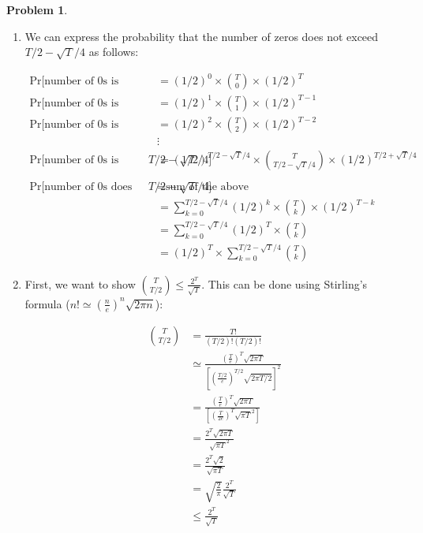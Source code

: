 \documentclass[11pt]{article}
\theoremstyle{definition}
\theoremstyle{case}
\theoremstyle{theorem}
\newtheorem{prob}{Problem}
\begin{document}
\newpage

\begin{prob}
\end{prob}

\begin{enumerate}[label=(\alph*)]

\item We can express the probability that the number of zeros does not exceed $T/2 - \sqrt T /4$ as follows:

\begin{align*}
  \text{Pr[number of 0s is exactly 0]} &= (1/2)^{0} \times {T \choose 0} \times (1/2)^{T} \\
  \text{Pr[number of 0s is exactly 1]} &= (1/2)^{1} \times {T \choose 1} \times (1/2)^{T-1} \\
  \text{Pr[number of 0s is exactly 2]} &= (1/2)^{2} \times {T \choose 2} \times (1/2)^{T-2} \\
                                       &\vdots \\
  \text{Pr[number of 0s is exactly $T/2 - \sqrt T /4$]} &= (1/2)^{T/2 - \sqrt T /4} \times {T \choose T/2 - \sqrt T /4} \times (1/2)^{T/2 + \sqrt T /4} \\
  \\
  \text{Pr[number of 0s does not exceed $T/2 - \sqrt T /4$]} &= \text{sum of the above} \\
                                                             &= \sum_{k=0}^{T/2 - \sqrt T /4} (1/2)^{k} \times {T \choose k} \times (1/2)^{T-k} \\
                                                             &= \sum_{k=0}^{T/2 - \sqrt T /4} (1/2)^{T} \times {T \choose k} \\
                                                             &= (1/2)^{T} \times \sum_{k=0}^{T/2 - \sqrt T /4} {T \choose k} 
\end{align*}

\newpage

\item First, we want to show ${T \choose T/2} \leq \frac{2^T}{\sqrt T}$. 
This can be done using Stirling's formula ($n! \simeq (\frac{n}{e})^{n} \sqrt{2 \pi n}$):

\begin{align*}
  {T \choose T/2} &= \frac{T!}{(T/2)!(T/2)!} \\
                  &\simeq \frac{(\frac{T}{e})^T \sqrt{2 \pi T}}{[(\frac{T/2}{e})^{T/2} \sqrt{2 \pi T/2}]^2} \\
                  &= \frac{(\frac{T}{e})^T \sqrt{2 \pi T}}{[(\frac{T}{2e})^{T} \sqrt{\pi T}^2]} \\
                  &= \frac{2^T \sqrt{2 \pi T}}{\sqrt{\pi T}^2} \\
                  &= \frac{2^T \sqrt{2}}{\sqrt{\pi T}} \\
                  &= \sqrt{\frac{2}{\pi}} \frac{2^T}{\sqrt T} \\
                  &\leq \frac{2^T}{\sqrt T}
\end{align*}


\end{enumerate}
\end{document}
